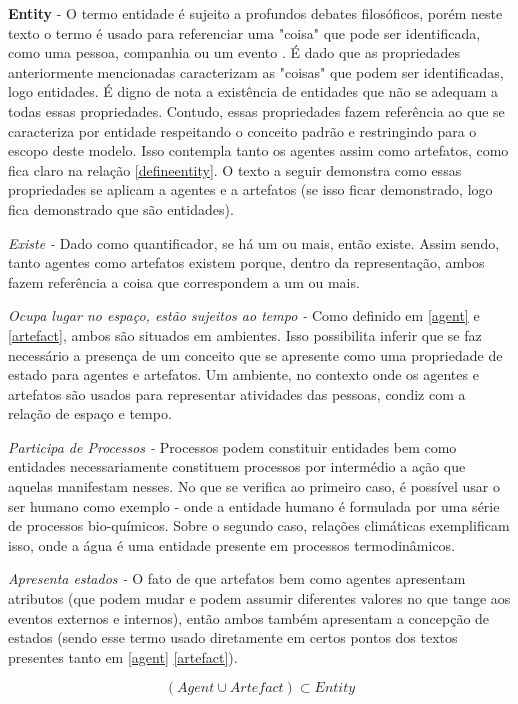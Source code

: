 \textbf{Entity} - O termo entidade é sujeito a profundos debates filosóficos, porém neste texto o termo é usado para referenciar uma "coisa" que pode ser identificada, como uma pessoa, companhia ou um evento \cite{entity}. É dado que as propriedades anteriormente mencionadas caracterizam as "coisas" que podem ser identificadas, logo entidades. É digno de nota a existência de entidades que não se adequam a todas essas propriedades. Contudo, essas propriedades fazem referência ao que se caracteriza por entidade respeitando o conceito padrão \cite{entity} e restringindo para o escopo deste modelo. Isso contempla tanto os agentes assim como artefatos, como fica claro na relação \ref{defineentity}. O texto a seguir demonstra como essas propriedades se aplicam a agentes e a artefatos (se isso ficar demonstrado, logo fica demonstrado que são entidades).

\textit{Existe -} Dado como quantificador, se há um ou mais, então existe. Assim sendo, tanto agentes como artefatos existem porque, dentro da representação, ambos fazem referência a coisa que correspondem a um ou mais. 

\textit{Ocupa lugar no espaço, estão sujeitos ao tempo - } Como definido em \ref{agent} e \ref{artefact}, ambos são situados em ambientes. 
Isso possibilita inferir que se faz necessário a presença de um conceito que se apresente como uma propriedade de estado para agentes e artefatos. Um ambiente, no contexto onde os agentes e artefatos são usados para representar atividades das pessoas, condiz com a relação de espaço e tempo. 

\textit{Participa de Processos -} Processos podem constituir entidades bem como entidades necessariamente constituem processos por intermédio a ação que aquelas manifestam nesses. No que se verifica ao primeiro caso, é possível usar o ser humano como exemplo - onde
a entidade humano é formulada por uma série de processos bio-químicos. Sobre o segundo caso, relações climáticas exemplificam isso, onde a água é uma entidade presente em processos termodinâmicos. 

\textit{Apresenta estados -} O fato de que artefatos bem como agentes apresentam atributos (que podem mudar e podem assumir diferentes valores no que tange aos eventos externos e internos), então ambos também apresentam a concepção de estados (sendo esse termo usado diretamente em certos pontos dos textos presentes tanto em \ref{agent} \ref{artefact}). 


\begin{equation} \label{defineentity} 
( Agent \cup Artefact ) \subset Entity
\end{equation}

